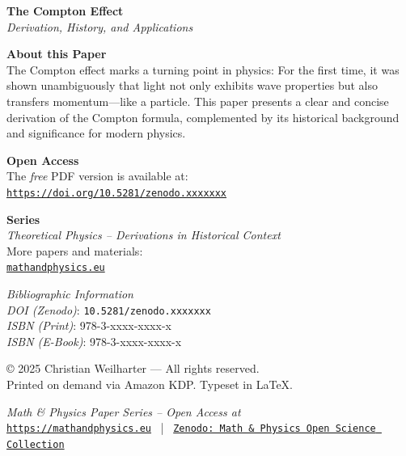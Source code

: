 \documentclass[12pt,oneside]{scrartcl}
\newcommand{\PaperDOI}{\emph{DOI (Zenodo)}: \texttt{10.5281/zenodo.xxxxxxx}}
\newcommand{\PaperISBNPDF}{\emph{ISBN (Print)}: 978-3-xxxx-xxxx-x}
\newcommand{\PaperISBNEPUB}{\emph{ISBN (E-Book)}: 978-3-xxxx-xxxx-x}
\begin{document}
	\vspace*{1.5cm}
	
	{\Large\bfseries The Compton Effect}\\[0.5em]
	{\large\itshape Derivation, History, and Applications}
	
	\vspace{1.2cm}
	
	\noindent
	\textbf{About this Paper}\\
	The Compton effect marks a turning point in physics:
	For the first time, it was shown unambiguously that light not only
	exhibits wave properties but also transfers momentum—like a particle.
	This paper presents a clear and concise derivation of the Compton
	formula, complemented by its historical background and significance
	for modern physics.
	
	\vspace{1.0cm}
	
	\noindent
	\textbf{Open Access}\\
	The \emph{free} PDF version is available at:\\[2pt]
	\href{https://doi.org/10.5281/zenodo.xxxxxxx}{\texttt{https://doi.org/10.5281/zenodo.xxxxxxx}}
	
	\vspace{0.8cm}
	
	\noindent
	\textbf{Series}\\
	\textit{Theoretical Physics – Derivations in Historical Context}\\
	More papers and materials:\\
	\href{https://mathandphysics.eu}{\texttt{mathandphysics.eu}}
	
	\vfill
	
	\noindent
	\small
	\textit{Bibliographic Information}\\
	\PaperDOI\\
	\PaperISBNPDF\\
	\PaperISBNEPUB
	
	\vspace{0.8cm}
	
	\noindent
	\footnotesize
	© 2025 Christian Weilharter — All rights reserved.\\
	Printed on demand via Amazon KDP. Typeset in \LaTeX.
	
	\vfill
	\begin{center}
		\small
		\textit{Math \& Physics Paper Series – Open Access at}\\[2pt]
		\href{https://mathandphysics.eu}{\texttt{https://mathandphysics.eu}} \, | \,
		\href{https://zenodo.org/communities/mathandphysics}{\texttt{Zenodo: Math \& Physics Open Science Collection}}
	\end{center}
	
\end{document}
